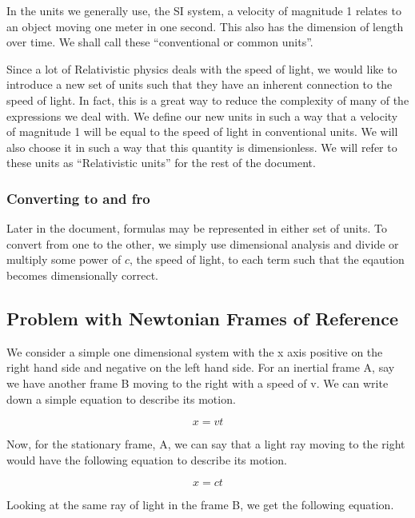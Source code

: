 \documentclass[16pt]{scrartcl}
\numberwithin{equation}{section}
\theoremstyle{plain}
\theoremstyle{definition}
\begin{document}
In the units we generally use, the SI system, a velocity of magnitude 1 relates to an object moving one meter in one second. This also has the dimension of length over time. We shall call these ``conventional or common units''.

Since a lot of Relativistic physics deals with the speed of light, we would like to introduce a new set of units such that they have an inherent connection to the speed of light. In fact, this is a great way to reduce the complexity of many of the expressions we deal with. We define our new units in such a way that a velocity of magnitude 1 will be equal to the speed of light in conventional units. We will also choose it in such a way that this quantity is dimensionless. We will refer to these units as ``Relativistic units'' for the rest of the document.

\subsubsection*{Converting to and fro}

Later in the document, formulas may be represented in either set of units. To convert from one to the other, we simply use dimensional analysis and divide or multiply some power of $c$, the speed of light, to each term such that the eqaution becomes dimensionally correct.

\subsection{Problem with Newtonian Frames of Reference}

We consider a simple one dimensional system with the x axis positive on the right hand side and negative on the left hand side. For an inertial frame A, say we have another frame B moving to the right with a speed of v. We can write down a simple equation to describe its motion.

\begin{equation}
    x = vt
\end{equation}

Now, for the stationary frame, A, we can say that a light ray moving to the right would have the following equation to describe its motion.

\begin{equation}
    x = ct
\end{equation}

Looking at the same ray of light in the frame B, we get the following equation.
\end{document}
